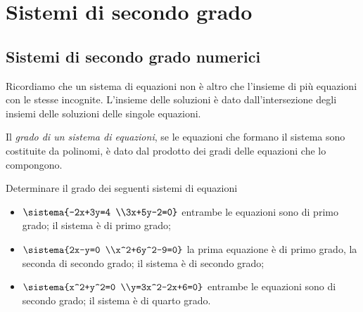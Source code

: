 


\chapter{Sistemi di secondo grado}


\section{Sistemi di secondo grado numerici}
\label{sec:sist2gr_sisteminumerci}

Ricordiamo che un sistema di equazioni non è altro che l'insieme di più 
equazioni con le stesse incognite. L'insieme delle soluzioni è dato 
dall'intersezione degli insiemi delle soluzioni delle singole equazioni.

\begin{definizione}{}{}
Il \emph{grado di un sistema di equazioni}, se le equazioni che formano il 
sistema sono costituite da polinomi, è dato dal prodotto dei gradi delle 
equazioni che lo compongono.
\end{definizione}

\begin{esempio}{}{}
Determinare il grado dei seguenti sistemi di equazioni

\begin{itemize}
\item \(\sistema{-2x+3y=4 \\3x+5y-2=0}\) 
entrambe le equazioni sono di primo grado; il sistema è di primo grado;
\item \(\sistema{2x-y=0 \\x^2+6y^2-9=0}\) la prima equazione è di primo grado,
la seconda di secondo grado; il sistema è di secondo grado;
\item 
\(\sistema{x^2+y^2=0 \\y=3x^2-2x+6=0}\) 
entrambe le equazioni sono di secondo grado; il sistema è di quarto grado.
\end{itemize}
\end{esempio}

